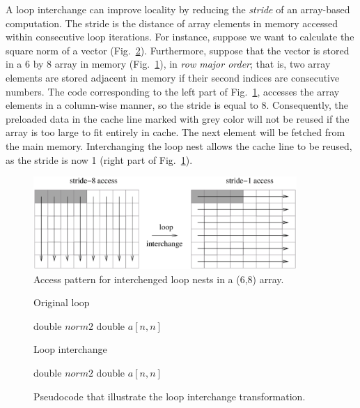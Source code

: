 A loop interchange can improve locality by reducing the \textit{stride} of an array-based computation. The stride is the distance of array elements in memory accessed within consecutive loop iterations. For instance, suppose we want to calculate the square norm of a vector (Fig.~\ref{algo:loop-interchange}). Furthermore, suppose that the vector is stored in a 6 by 8 array in memory (Fig.~\ref{fig:interchanged-loop-nests}), in \textit{row major order}; that is, two array elements are stored adjacent in memory if their second indices are consecutive numbers. The code corresponding to the left part of Fig.~\ref{fig:interchanged-loop-nests}, accesses the array elements in a column-wise manner, so the stride is equal to 8. Consequently, the preloaded data in the cache line marked with grey color will not be reused if the array is too large to fit entirely in cache. The next element will be fetched from the main memory. Interchanging the loop nest allows the cache line to be reused, as the stride is now 1 (right part of Fig.~\ref{fig:interchanged-loop-nests}). \\
\begin{figure}[h]
   \centering
   \includegraphics[width=10cm]{Figs/Interchanged_loop_nests.eps}
   \caption{Access pattern for interchenged loop nests in a (6,8) array.} \label{fig:interchanged-loop-nests}
\end{figure} 

\begin{figure}[t!]
\begin{minipage}[t]{6.5cm}
\null
\begin{algorithm}[H]
\caption{Original loop} 
\SetAlgoLined
double $norm2$\;
double $a[n,n]$\;
\end{algorithm}
\end{minipage}%
\begin{minipage}[t]{6.5cm}
\null
\begin{algorithm}[H]
\caption{Loop interchange} 
\SetAlgoLined
double $norm2$\;
double $a[n,n]$\;
\end{algorithm}
\end{minipage}
\caption{Pseudocode that illustrate the loop interchange transformation.} \label{algo:loop-interchange}
\end{figure}

